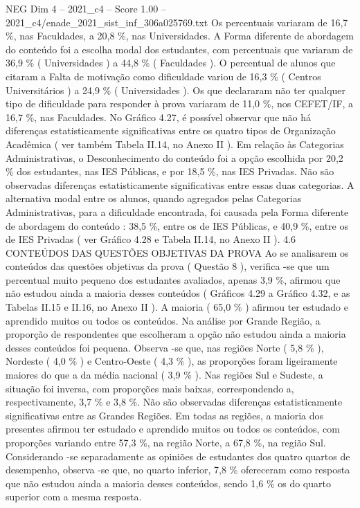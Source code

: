 \begin{textsample}{NEG Dim 4 – 2021\_c4 – Score 1.00 – 2021\_c4/enade\_2021\_sist\_inf\_306a025769.txt}
Os percentuais variaram de 16,7 \%, nas Faculdades, a 20,8 \%, nas Universidades.
A Forma diferente de abordagem do conteúdo foi a escolha modal dos estudantes, com percentuais que variaram de 36,9 \% ( Universidades ) a 44,8 \% ( Faculdades ).
O percentual de alunos que citaram a Falta de motivação como dificuldade variou de 16,3 \% ( Centros Universitários ) a 24,9 \% ( Universidades ).
Os que declararam não ter qualquer tipo de dificuldade para responder à prova variaram de 11,0 \%, nos CEFET/IF, a 16,7 \%, nas Faculdades.
No Gráfico 4.27, é possível observar que não há diferenças estatisticamente significativas entre os quatro tipos de Organização Acadêmica ( ver também Tabela II.14, no Anexo II ).
Em relação às Categorias Administrativas, o Desconhecimento do conteúdo foi a opção escolhida por 20,2 \% dos estudantes, nas IES Públicas, e por 18,5 \%, nas IES Privadas.
Não são observadas diferenças estatisticamente significativas entre essas duas categorias.
A alternativa modal entre os alunos, quando agregados pelas Categorias Administrativas, para a dificuldade encontrada, foi causada pela Forma diferente de abordagem do conteúdo : 38,5 \%, entre os de IES Públicas, e 40,9 \%, entre os de IES Privadas ( ver Gráfico 4.28 e Tabela II.14, no Anexo II ). 4.6 CONTEÚDOS DAS QUESTÕES OBJETIVAS DA PROVA Ao se analisarem os conteúdos das questões objetivas da prova ( Questão 8 ), verifica -se que um percentual muito pequeno dos estudantes avaliados, apenas 3,9 \%, afirmou que não estudou ainda a maioria desses conteúdos ( Gráficos 4.29 a Gráfico 4.32, e as Tabelas II.15 e II.16, no Anexo II ).
A maioria ( 65,0 \% ) afirmou ter estudado e aprendido muitos ou todos os conteúdos.
Na análise por Grande Região, a proporção de respondentes que escolheram a opção não estudou ainda a maioria desses conteúdos foi pequena.
Observa -se que, nas regiões Norte ( 5,8 \% ), Nordeste ( 4,0 \% ) e Centro-Oeste ( 4,3 \% ), as proporções foram ligeiramente maiores do que a da média nacional ( 3,9 \% ).
Nas regiões Sul e Sudeste, a situação foi inversa, com proporções mais baixas, correspondendo a, respectivamente, 3,7 \% e 3,8 \%.
Não são observadas diferenças estatisticamente significativas entre as Grandes Regiões.
Em todas as regiões, a maioria dos presentes afirmou ter estudado e aprendido muitos ou todos os conteúdos, com proporções variando entre 57,3 \%, na região Norte, a 67,8 \%, na região Sul.
Considerando -se separadamente as opiniões de estudantes dos quatro quartos de desempenho, observa -se que, no quarto inferior, 7,8 \% ofereceram como resposta que não estudou ainda a maioria desses conteúdos, sendo 1,6 \% os do quarto superior com a mesma resposta.

\end{textsample}

